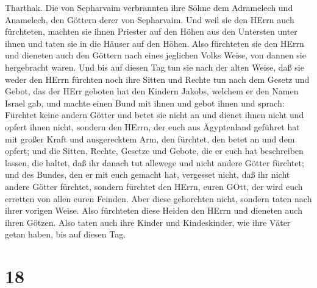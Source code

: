 Tharthak. Die von Sepharvaim verbrannten ihre Söhne dem Adramelech und
Anamelech, den Göttern derer von Sepharvaim.  Und weil sie
den HErrn auch fürchteten, machten sie ihnen Priester auf den Höhen aus
den Untersten unter ihnen und taten sie in die Häuser auf den Höhen.
 Also fürchteten sie den HErrn und dieneten auch den
Göttern nach eines jeglichen Volks Weise, von dannen sie hergebracht
waren.  Und bis auf diesen Tag tun sie nach der alten
Weise, daß sie weder den HErrn fürchten noch ihre Sitten und Rechte tun
nach dem Gesetz und Gebot, das der HErr geboten hat den Kindern Jakobs,
welchem er den Namen Israel gab,  und machte einen Bund mit
ihnen und gebot ihnen und sprach: Fürchtet keine andern Götter und betet
sie nicht an und dienet ihnen nicht und opfert ihnen nicht,
 sondern den HErrn, der euch aus Ägyptenland geführet hat
mit großer Kraft und ausgerecktem Arm, den fürchtet, den betet an und
dem opfert;  und die Sitten, Rechte, Gesetze und Gebote,
die er euch hat beschreiben lassen, die haltet, daß ihr danach tut
allewege und nicht andere Götter fürchtet;  und des Bundes,
den er mit euch gemacht hat, vergesset nicht, daß ihr nicht andere
Götter fürchtet,  sondern fürchtet den HErrn, euren GOtt,
der wird euch erretten von allen euren Feinden.  Aber diese
gehorchten nicht, sondern taten nach ihrer vorigen Weise. 
Also fürchteten diese Heiden den HErrn und dieneten auch ihren Götzen.
Also taten auch ihre Kinder und Kindeskinder, wie ihre Väter getan
haben, bis auf diesen Tag.

\hypertarget{section-17}{%
\section{18}\label{section-17}}

